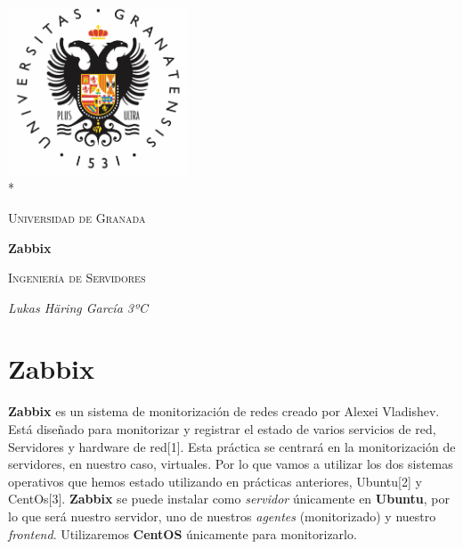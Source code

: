 \documentclass[12pt,a4paper]{article}
\date{\specialdate\today}
\begin{document}
	\begin{titlepage}
		\centering
		\includegraphics[width=0.4\textwidth]{logo-ugr.png}\\*
		{\scshape\LARGE Universidad de Granada \par}
		{\large \date{\specialdate\today}\par}
		\vspace{1cm}
		{\LARGE\bfseries Zabbix\par}
		\vspace{1.5cm}
		{\scshape\large Ingeniería de Servidores\par}
		\vspace{2cm}
		{\Large\itshape Lukas Häring García 3ºC\par}
	\end{titlepage}
	
	\tableofcontents
	
	\newpage
	
	\section{Zabbix}
	\textbf{Zabbix} es un sistema de monitorización de redes creado por Alexei Vladishev. Está diseñado para monitorizar y registrar el estado de varios servicios de red, Servidores y hardware de red[1].
	\newline
	\newline
	Esta práctica se centrará en la monitorización de servidores, en nuestro caso, virtuales. Por lo que vamos a utilizar los dos sistemas operativos que hemos estado utilizando en prácticas anteriores, Ubuntu[2] y CentOs[3].
	\newline
	\newline
	\textbf{Zabbix} se puede instalar como \textit{servidor} únicamente en \textbf{Ubuntu}, por lo que será nuestro servidor, uno de nuestros \textit{agentes} (monitorizado) y nuestro \textit{frontend}. Utilizaremos \textbf{CentOS} únicamente para monitorizarlo.
	
\end{document}
